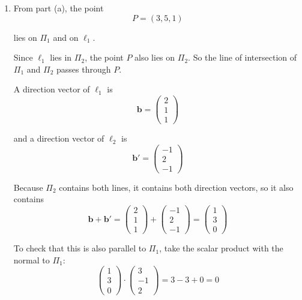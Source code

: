 \documentclass[leqno]{article}
\begin{document}
\begin{enumerate}[
  label=\textbf{\arabic*.},
  leftmargin=*,
  topsep=0pt,
  partopsep=0pt,
  parsep=0pt
]
\begin{djsSolution}
\begin{enumerate}[label=\textbf{(\alph*)}]
{so it also passes through $P$. Two lines through the same point in the same direction are the same line, so $\ell_2$ is
\[
\mathbf r=\begin{pmatrix}4\\3\\2\end{pmatrix}+\mu\begin{pmatrix}-1\\2\\-1\end{pmatrix}
\]

as required.
\par}

  \item From part (a), the point
\[
P=(3,5,1)
\]

lies on $\Pi_1$ and on $\ell_1$.

Since $\ell_1$ lies in $\Pi_2$, the point $P$ also lies on $\Pi_2$. So the line of intersection of $\Pi_1$ and $\Pi_2$ passes through $P$.

A direction vector of $\ell_1$ is
\[
\mathbf b=\begin{pmatrix}2\\1\\1\end{pmatrix}
\]

and a direction vector of $\ell_2$ is
\[
\mathbf b'=\begin{pmatrix}-1\\2\\-1\end{pmatrix}
\]

Because $\Pi_2$ contains both lines, it contains both direction vectors, so it also contains
\[
\mathbf b+\mathbf b'
=
\begin{pmatrix}2\\1\\1\end{pmatrix}
+
\begin{pmatrix}-1\\2\\-1\end{pmatrix}
=
\begin{pmatrix}1\\3\\0\end{pmatrix}
\]

To check that this is also parallel to $\Pi_1$, take the scalar product with the normal to $\Pi_1$:
\[
\begin{pmatrix}1\\3\\0\end{pmatrix}\cdot
\begin{pmatrix}3\\-1\\2\end{pmatrix}
=3-3+0=0
\]


\end{enumerate}
\end{djsSolution}
\end{enumerate}
\end{document}
